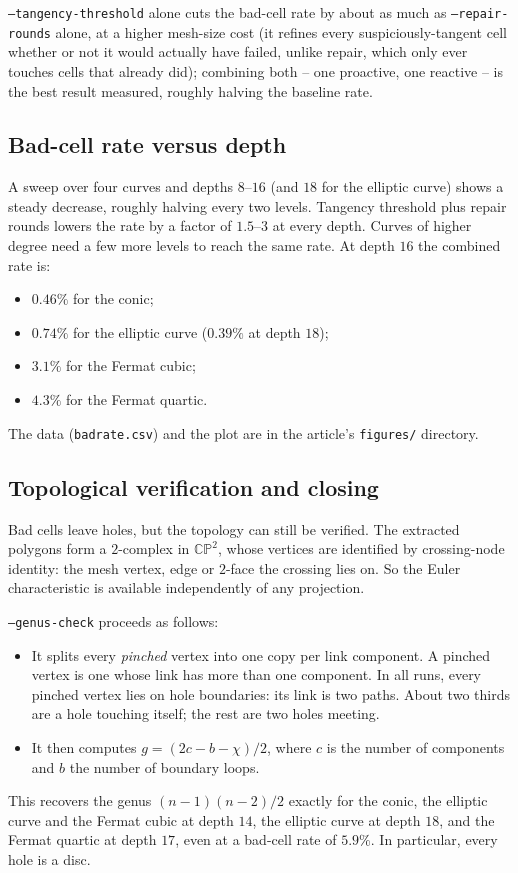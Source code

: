 \documentclass[11pt]{article}
\newcommand{\CP}{\mathbb{CP}}
\begin{document}
\texttt{--tangency-threshold} alone cuts the bad-cell rate by about as
much as \texttt{--repair-rounds} alone, at a higher mesh-size cost (it
refines every suspiciously-tangent cell whether or not it would actually
have failed, unlike repair, which only ever touches cells that already
did); combining both -- one proactive, one reactive -- is the best result
measured, roughly halving the baseline rate.

\subsection{Bad-cell rate versus depth}

A sweep over four curves and depths $8$--$16$ (and $18$ for the elliptic
curve) shows a steady decrease, roughly halving every two levels.
Tangency threshold plus repair rounds lowers the rate by a factor of
$1.5$--$3$ at every depth. Curves of higher degree need a few more
levels to reach the same rate. At depth $16$ the combined rate is:
\begin{itemize}
\item $0.46\%$ for the conic;
\item $0.74\%$ for the elliptic curve ($0.39\%$ at depth $18$);
\item $3.1\%$ for the Fermat cubic;
\item $4.3\%$ for the Fermat quartic.
\end{itemize}
The data (\texttt{badrate.csv}) and the plot are in the article's
\texttt{figures/} directory.

\subsection{Topological verification and closing}
\label{sec:topology}

Bad cells leave holes, but the topology can still be verified. The
extracted polygons form a $2$-complex in $\CP^2$, whose vertices are
identified by crossing-node identity: the mesh vertex, edge or $2$-face
the crossing lies on. So the Euler characteristic is available
independently of any projection.

\texttt{--genus-check} proceeds as follows:
\begin{itemize}
\item It splits every \emph{pinched} vertex into one copy per link
  component. A pinched vertex is one whose link has more than one
  component. In all runs, every pinched vertex lies on hole boundaries:
  its link is two paths. About two thirds are a hole touching itself; the
  rest are two holes meeting.
\item It then computes $g=(2c-b-\chi)/2$, where $c$ is the number of
  components and $b$ the number of boundary loops.
\end{itemize}
This recovers the genus $(n-1)(n-2)/2$ exactly for the conic, the
elliptic curve and the Fermat cubic at depth $14$, the elliptic curve at
depth $18$, and the Fermat quartic at depth $17$, even at a bad-cell rate
of $5.9\%$. In particular, every hole is a disc.
\end{document}
